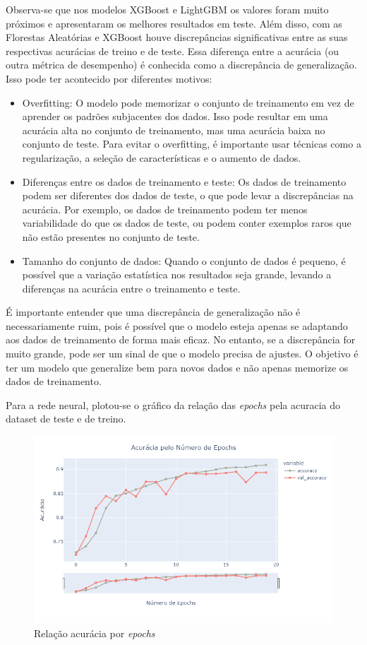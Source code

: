 Observa-se que nos modelos XGBoost e LightGBM os valores foram muito próximos e apresentaram os melhores resultados em teste. Além disso, com as Florestas Aleatórias e XGBoost houve discrepâncias significativas entre as suas respectivas acurácias de treino e de teste. Essa diferença entre a acurácia (ou outra métrica de desempenho) é conhecida como a discrepância de generalização. Isso pode ter acontecido por diferentes motivos:

\begin{itemize}
    \item Overfitting: O modelo pode memorizar o conjunto de treinamento em vez de aprender os padrões subjacentes dos dados. Isso pode resultar em uma acurácia alta no conjunto de treinamento, mas uma acurácia baixa no conjunto de teste. Para evitar o overfitting, é importante usar técnicas como a regularização, a seleção de características e o aumento de dados.
    \item Diferenças entre os dados de treinamento e teste: Os dados de treinamento podem ser diferentes dos dados de teste, o que pode levar a discrepâncias na acurácia. Por exemplo, os dados de treinamento podem ter menos variabilidade do que os dados de teste, ou podem conter exemplos raros que não estão presentes no conjunto de teste.
    \item Tamanho do conjunto de dados: Quando o conjunto de dados é pequeno, é possível que a variação estatística nos resultados seja grande, levando a diferenças na acurácia entre o treinamento e teste.
\end{itemize}

É importante entender que uma discrepância de generalização não é necessariamente ruim, pois é possível que o modelo esteja apenas se adaptando aos dados de treinamento de forma mais eficaz. No entanto, se a discrepância for muito grande, pode ser um sinal de que o modelo precisa de ajustes. O objetivo é ter um modelo que generalize bem para novos dados e não apenas memorize os dados de treinamento.

Para a rede neural, plotou-se o gráfico da relação das \textit{epochs} pela acuracia do dataset de teste e de treino.
\begin{figure}[H]
    \centering
    \includegraphics[scale=0.55]{./figs/lstm_acuracy.png}
    \caption{Relação acurácia por \textit{epochs}}
    \label{fig:lstmacuracy}
\end{figure}

